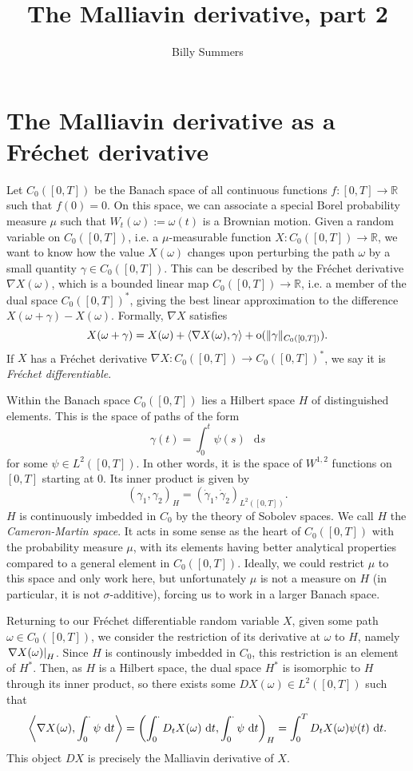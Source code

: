 \documentclass[11pt, a4paper, twoside]{book}
\title{The Malliavin derivative, part 2}
\author{Billy Summers}
\theoremstyle{plain}
\theoremstyle{definition}
\theoremstyle{remark}
\renewcommand{\d}{\mathop{}\!\mathrm{d}}
\renewcommand{\o}{\mathrm{o}}
\newcommand{\bbR}{\mathbb{R}}
\DeclarePairedDelimiter{\angles}{\langle}{\rangle}
\DeclarePairedDelimiter{\eval}{.}{\rvert}
\DeclarePairedDelimiter{\norm}{\lVert}{\rVert}
\DeclarePairedDelimiter{\parens}{\lparen}{\rparen}
\begin{document}
\maketitle

\section{The Malliavin derivative as a Fr\'{e}chet derivative}
Let $C_0([0, T])$ be the Banach space of all continuous functions $f \colon [0,
		T] \to \bbR$ such that $f(0) = 0$. On this space, we can associate a special
Borel probability measure $\mu$ such that $W_t(\omega) := \omega(t)$ is a
Brownian motion. Given a random variable on $C_0([0, T])$, i.e. a
$\mu$-measurable function $X \colon C_0([0, T]) \to \bbR$, we want to know how
the value $X(\omega)$ changes upon perturbing the path $\omega$ by a small
quantity $\gamma \in C_0([0, T])$. This can be described by the Fr\'{e}chet
derivative $\nabla{X}(\omega)$, which is a bounded linear map $C_0([0, T]) \to
	\bbR$, i.e. a member of the dual space $C_0([0, T])^*$, giving the best linear
approximation to the difference $X(\omega + \gamma) - X(\omega)$. Formally,
$\nabla{X}$ satisfies
\[
	X(\omega + \gamma)
	= X(\omega)
	+ \angles{\nabla{X}(\omega), \gamma}
	+ \o(\norm{\gamma}_{C_0([0, T])}).
\]
If $X$ has a Fr\'{e}chet derivative $\nabla{X} \colon C_0([0, T]) \to C_0([0,
			T])^*$, we say it is \emph{Fr\'{e}chet differentiable}.

Within the Banach space $C_0([0, T])$ lies a Hilbert space $H$ of distinguished
elements. This is the space of paths of the form
\[
	\gamma(t) = \int_0^t \psi(s) \, \d{s}
\]
for some $\psi \in L^2([0, T])$. In other words, it is the space of $W^{1, 2}$
functions on $[0, T]$ starting at 0. Its inner product is given by
\[
	(\gamma_1, \gamma_2)_H = (\dot{\gamma}_1, \dot{\gamma}_2)_{L^2([0, T])}.
\]
$H$ is continuously imbedded in $C_0$ by the theory of Sobolev spaces. We call
$H$ the \emph{Cameron-Martin space}. It acts in some sense as the heart
of $C_0([0, T])$ with the probability measure $\mu$, with its elements having
better analytical properties compared to a general element in $C_0([0, T])$.
Ideally, we could restrict $\mu$ to this space and only work here, but
unfortunately $\mu$ is not a measure on $H$ (in particular, it is not
$\sigma$-additive), forcing us to work in a larger Banach space.

Returning to our Fr\'{e}chet differentiable random variable $X$, given some
path $\omega \in C_0([0, T])$, we consider the restriction of its derivative at
$\omega$ to $H$, namely $\eval*{\nabla{X}(\omega)}_H$. Since $H$ is continously
imbedded in $C_0$, this restriction is an element of $H^*$. Then, as $H$ is a
Hilbert space, the dual space $H^*$ is isomorphic to $H$ through its inner
product, so there exists some $DX(\omega) \in L^2([0, T])$ such
that
\[
	\angles*{\nabla{X}(\omega), \int_0^\cdot \psi \, \d{t}}
	= \parens*{\int_0^\cdot D_t{X}(\omega) \, \d{t},
	\int_0^\cdot \psi \, \d{t}}_H
	= \int_0^T D_t{X}(\omega) \psi(t) \, \d{t}.
\]
This object $DX$ is precisely the Malliavin derivative of $X$.
\end{document}
